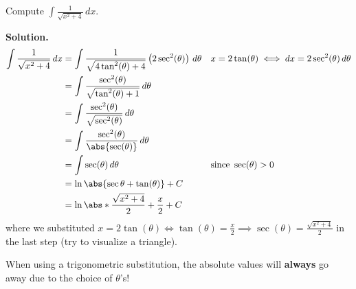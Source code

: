 \begin{Example}{}{}
    Compute $ \displaystyle   \int \frac{1}{\sqrt{x^2+4}} \, d{x} $.

    \textbf{Solution.}
    \begin{align*}
        \int \frac{1}{\sqrt{x^2+4}} \, d{x}
         & =\int \frac{1}{\sqrt{4\tan^2(\theta)+4}} \left(2\sec^2(\theta)\right) \, d{\theta}
         &                                                                                    & x=2\tan(\theta)\iff dx=2\sec^2(\theta)\,d\theta                               \\
         & =\int \frac{\sec^2(\theta)}{\sqrt{\tan^2(\theta)+1}} \, d{\theta}                                                                                                  \\
         & =\int \frac{\sec^2(\theta)}{\sqrt{\sec^2(\theta)}} \, d{\theta}                                                                                                    \\
         & =\int \frac{\sec^2(\theta)}{\abs{\sec(\theta)}} \, d{\theta}                                                                                                       \\
         & =\int \sec(\theta)\, d{\theta}                                                     &                                                 & \text{since }\sec(\theta)>0 \\
         & =\ln\abs{\sec{\theta}+\tan(\theta)}+C                                              &                                                                               \\
         & =\ln\abs*{\frac{\sqrt{x^2+4}}{2}+\frac{x}{2}}+C
    \end{align*}
    where we substituted $
        \displaystyle x=2\tan(\theta)\iff \tan(\theta)=\frac{x}{2}\implies
        \sec(\theta)=\frac{\sqrt{x^2+4}}{2} $ in the last step (try to visualize a triangle).
\end{Example}

\begin{Remark}{}{}
    When using a trigonometric substitution, the absolute values will \textbf{always}
    go away due to the choice of $ \theta $'s!
\end{Remark}

